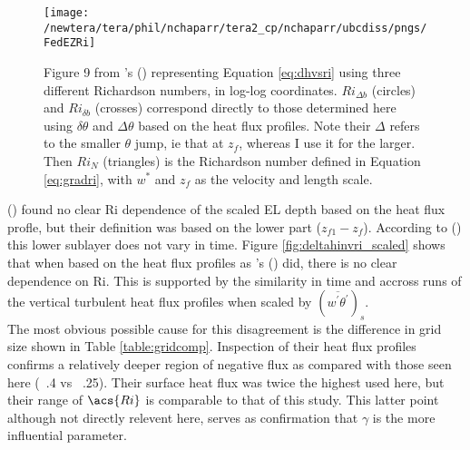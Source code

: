 \begin{figure}[htbp]
    \centering
    \texttt{[image: /newtera/tera/phil/nchaparr/tera2\_cp/nchaparr/ubcdiss/pngs/FedEZRi]}
    \caption[Plot of the relationship between scaled \acs{EZ} depth and Richardson number from \citeauthor{FedConzMir04}'s (\citeyear{FedConzMir04})]{Figure 9 from \citeauthor{FedConzMir04}'s (\citeyear{FedConzMir04}) representing Equation \ref{eq:dhvsri} using three different Richardson numbers, in log-log coordinates.  $Ri_{\Delta b}$ (circles) and $Ri_{\delta b}$ (crosses) correspond directly to those determined here using $\delta \theta$ and $\Delta \theta$ based on the heat flux profiles.  Note their $\Delta$ refers to the smaller $\theta$ jump, ie that at $z_{f}$, whereas I use it for the larger.  Then $Ri_{N}$ (triangles) is the Richardson number defined in Equation \ref{eq:gradri}, with $w^{*}$ and $z_{f}$ as the velocity and length scale.}
    \label{fig:FedEZRi}   %
\end{figure}


 \citeauthor{BrooksFowler2} (\citeyear{BrooksFowler2}) found no clear \acs{Ri} dependence of the scaled \acs{EL} depth based on the heat flux profle, but their definition was based on the lower part ($z_{f1} - z_{f}$).  According to \citeauthor{FedConzMir04} (\citeyear{FedConzMir04}) this lower sublayer does not vary in time.  Figure \ref{fig:deltahinvri_scaled} shows that when based on the heat flux profiles as \citeauthor{FedConzMir04}'s (\citeyear{FedConzMir04}) did, there is no clear dependence on \acs{Ri}. This is supported by the similarity in time and accross runs of the vertical turbulent heat flux profiles when scaled by $(\overline{w^{'}\theta^{'}})_{s}$.\\

The most obvious possible cause for this disagreement is the difference in grid size shown in Table \ref{table:gridcomp}.  Inspection of their heat flux profiles confirms a relatively deeper region of negative flux as compared with those seen here (~.4 vs ~.25). Their surface heat flux was twice the highest used here, but their range of $\acs{Ri}$ is comparable to that of this study.  This latter point although not directly relevent here, serves as confirmation that $\gamma$ is the more influential parameter.\\              

